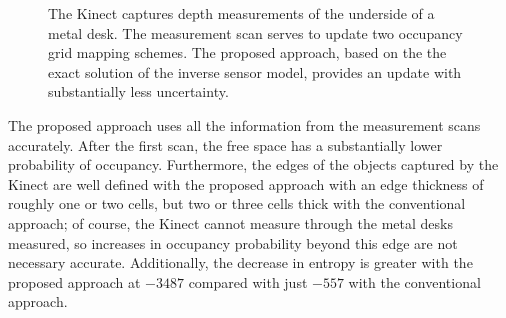 \documentclass[letterpaper, 10pt, conference]{ieeeconf}
\newcommand{\refeqn}[1]{(\ref{eqn:#1})}
\begin{document}
\begin{figure}[h]
{{	}
	\hspace*{0.1\columnwidth}
}
\caption{The Kinect captures depth measurements of the underside of a metal desk. The measurement scan serves to update two occupancy grid mapping schemes. The proposed approach, based on the the exact solution of the inverse sensor model, provides an update with substantially less uncertainty.}
\end{figure}



%
%

The proposed approach uses all the information from the measurement scans accurately. After the first scan, the free space has a substantially lower probability of occupancy. Furthermore, the edges of the objects captured by the Kinect are well defined with the proposed approach with an edge thickness of roughly one or two cells, but two or three cells thick with the conventional approach; of course, the Kinect cannot measure through the metal desks measured, so increases in occupancy probability beyond this edge are not necessary accurate.
Additionally, the decrease in entropy is greater with the proposed approach at $-3487$ compared with just $-557$ with the conventional approach.
\end{document}
